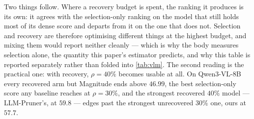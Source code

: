 Two things follow. Where a recovery budget is spent, the ranking it produces is its own: it agrees
with the selection-only ranking on the model that still holds most of its dense score and departs
from it on the one that does not. Selection and recovery are therefore optimising different things at
the highest budget, and mixing them would report neither cleanly --- which is why the body measures
selection alone, the quantity this paper's estimator predicts, and why this table is reported
separately rather than folded into \cref{tab:vlm}. The second reading is the practical one: with
recovery, $\rho{=}40\%$ becomes
usable at all. On Qwen3-VL-8B every recovered arm but Magnitude ends above $46.99$, the best
selection-only score any baseline reaches at $\rho{=}30\%$, and the strongest recovered $40\%$ model
--- LLM-Pruner's, at $59.8$ --- edges past the strongest unrecovered $30\%$ one, ours at $57.7$.

\begin{table}[htbp]
\centering\small
\caption{One identical LoRA recovery stage on every arm, $1000$ items per benchmark.
\emph{sel.\ only} repeats the selection-only row; $+$LoRA is the same model after the stage.}
\label{tab:vlm-recovery}
\end{table}
